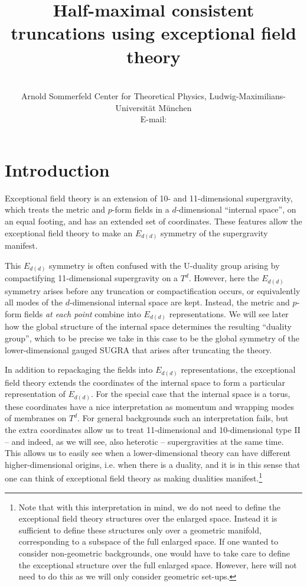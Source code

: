 \documentclass{PoS}
\title{Half-maximal consistent truncations using exceptional field theory}
\author{\speaker{Emanuel Malek}\\
       Arnold Sommerfeld Center for Theoretical Physics, Ludwig-Maximilians-Universit\"at M\"unchen\\
       E-mail: \email{e.malek@lmu.de}}
\begin{document}
\section{Introduction}
Exceptional field theory \cite{Berman:2010is,Hohm:2013vpa} is an extension of 10- and 11-dimensional supergravity, which treats the metric and $p$-form fields in a $d$-dimensional ``internal space'', on an equal footing, and has an extended set of coordinates. These features allow the exceptional field theory to make an $E_{d(d)}$ symmetry of the supergravity manifest.

This $E_{d(d)}$ symmetry is often confused with the U-duality group arising by compactifying 11-dimensional supergravity on a $T^d$. However, here the $E_{d(d)}$ symmetry arises before any truncation or compactification occurs, or equivalently all modes of the $d$-dimensional internal space are kept. Instead, the metric and $p$-form fields \emph{at each point} combine into $E_{d(d)}$ representations. We will see later how the global structure of the internal space determines the resulting ``duality group'', which to be precise we take in this case to be the global symmetry of the lower-dimensional gauged SUGRA that arises after truncating the theory.

In addition to repackaging the fields into $E_{d(d)}$ representations, the exceptional field theory extends the coordinates of the internal space to form a particular representation of $E_{d(d)}$. For the special case that the internal space is a torus, these coordinates have a nice interpretation as momentum and wrapping modes of membranes on $T^d$. For general backgrounds such an interpretation fails, but the extra coordinates allow us to treat 11-dimensional and 10-dimensional type II -- and indeed, as we will see, also heterotic -- supergravities at the same time. This allows us to easily see when a lower-dimensional theory can have different higher-dimensional origins, i.e. when there is a duality, and it is in this sense that one can think of exceptional field theory as making dualities manifest.\footnote{Note that with this interpretation in mind, we do not need to define the exceptional field theory structures over the enlarged space. Instead it is sufficient to define these structures only over a geometric manifold, corresponding to a subspace of the full enlarged space. If one wanted to consider non-geometric backgrounds, one would have to take care to define the exceptional structure over the full enlarged space. However, here will not need to do this as we will only consider geometric set-ups.}
\end{document}

